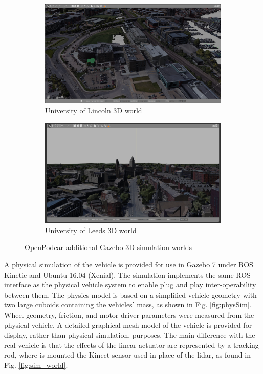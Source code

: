 \documentclass[a4paper]{article}
\begin{document}
	\begin{figure}
		\centering
		\begin{subfigure}{0.45\textwidth}
			\centering
			\includegraphics[width=\columnwidth]{figs_sim/INBLincoln_2.png}
			\caption{University of Lincoln 3D world}
			\label{fig:INB_world}
		\end{subfigure}	
		\quad
		\begin{subfigure}{0.45\textwidth}
			\centering
			\includegraphics[width=\columnwidth]{figs_sim/woodhouseLeeds_5.png}
			\caption{University of Leeds 3D world}
			\label{fig:Leeds_world}
		\end{subfigure}	
		\caption{OpenPodcar additional Gazebo 3D simulation worlds}
		\label{fig:gazebo_new_worlds}
	\end{figure}
	
	A physical simulation of the vehicle is provided for use in Gazebo 7 \cite{koenig2004design} under ROS Kinetic and Ubuntu 16.04 (Xenial). The simulation implements the same ROS interface as the physical vehicle system to enable plug and play inter-operability between them. The physics model is based on a simplified vehicle geometry with two large cuboids containing the vehicles’ mass, as shown in Fig. \ref{fig:physSim}. Wheel geometry, friction, and motor driver parameters were measured from the physical vehicle. A detailed graphical mesh model of the vehicle is provided for display, rather than physical simulation, purposes. The main difference with the real vehicle is that the effects of the linear actuator are represented by a tracking rod, where is mounted the Kinect sensor used in place of the lidar, as found in Fig. \ref{fig:sim_world}.
	
\end{document}

